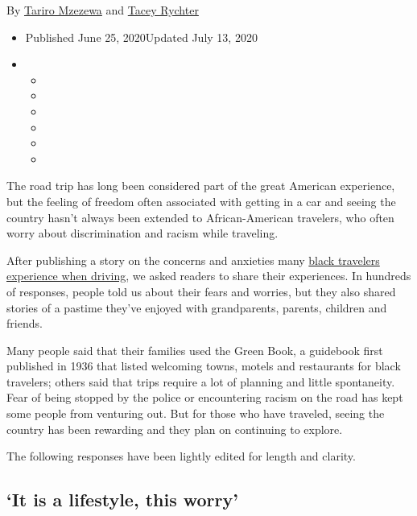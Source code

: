 By \href{https://www.nytimes3xbfgragh.onion/by/tariro-mzezewa}{Tariro
Mzezewa} and
\href{https://www.nytimes3xbfgragh.onion/by/tacey-rychter}{Tacey
Rychter}

\begin{itemize}
\item
  Published June 25, 2020Updated July 13, 2020
\item
  \begin{itemize}
  \item
  \item
  \item
  \item
  \item
  \item
  \end{itemize}
\end{itemize}

The road trip has long been considered part of the great American
experience, but the feeling of freedom often associated with getting in
a car and seeing the country hasn't always been extended to
African-American travelers, who often worry about discrimination and
racism while traveling.

After publishing a story on the concerns and anxieties many
\href{https://www.nytimes3xbfgragh.onion/2020/06/10/travel/road-trip-black.html}{black
travelers experience when driving}, we asked readers to share their
experiences. In hundreds of responses, people told us about their fears
and worries, but they also shared stories of a pastime they've enjoyed
with grandparents, parents, children and friends.

Many people said that their families used the Green Book, a guidebook
first published in 1936 that listed welcoming towns, motels and
restaurants for black travelers; others said that trips require a lot of
planning and little spontaneity. Fear of being stopped by the police or
encountering racism on the road has kept some people from venturing out.
But for those who have traveled, seeing the country has been rewarding
and they plan on continuing to explore.

The following responses have been lightly edited for length and clarity.

\hypertarget{it-is-a-lifestyle-this-worry}{%
\subsection{`It is a lifestyle, this
worry'}\label{it-is-a-lifestyle-this-worry}}

